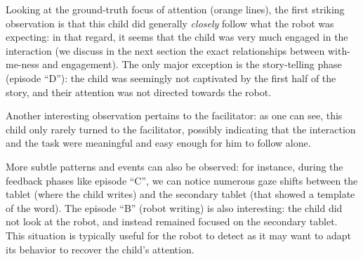 \documentclass{sig-alternate}
\begin{document}
Looking at the ground-truth focus of attention (orange lines), the first
striking observation is that this child did generally \emph{closely} follow what
the robot was expecting: in that regard, it seems that the child was very much
engaged in the interaction (we discuss in the next section the exact
relationships between with-me-ness and engagement). The only major exception is
the story-telling phase (episode ``D''): the child was seemingly not captivated
by the first half of the story, and their attention was not directed towards the
robot.

Another interesting observation pertains to the facilitator: as one can see,
this child only rarely turned to the facilitator, possibly indicating that the
interaction and the task were meaningful and easy enough for him to follow
alone.

More subtle patterns and events can also be observed: for instance, during the
feedback phases like episode ``C'', we can notice numerous gaze shifts between
the tablet (where the child writes) and the secondary tablet (that showed a
template of the word). The episode ``B'' (robot writing) is also interesting:
the child did not look at the robot, and instead remained focused on the
secondary tablet. This situation is typically useful for the robot to detect as
it may want to adapt its behavior to recover the child's attention.


%
\end{document}
